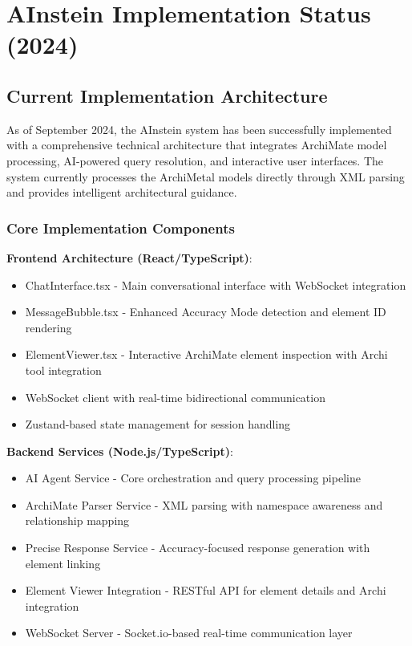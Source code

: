 \documentclass[12pt,a4paper]{article}
\begin{document}
\section{AInstein Implementation Status (2024)}

\subsection{Current Implementation Architecture}

As of September 2024, the AInstein system has been successfully implemented with a comprehensive technical architecture that integrates ArchiMate model processing, AI-powered query resolution, and interactive user interfaces. The system currently processes the ArchiMetal models directly through XML parsing and provides intelligent architectural guidance.

\subsubsection{Core Implementation Components}

\textbf{Frontend Architecture (React/TypeScript)}:
\begin{itemize}
    \item ChatInterface.tsx - Main conversational interface with WebSocket integration
    \item MessageBubble.tsx - Enhanced Accuracy Mode detection and element ID rendering
    \item ElementViewer.tsx - Interactive ArchiMate element inspection with Archi tool integration
    \item WebSocket client with real-time bidirectional communication
    \item Zustand-based state management for session handling
\end{itemize}

\textbf{Backend Services (Node.js/TypeScript)}:
\begin{itemize}
    \item AI Agent Service - Core orchestration and query processing pipeline
    \item ArchiMate Parser Service - XML parsing with namespace awareness and relationship mapping
    \item Precise Response Service - Accuracy-focused response generation with element linking
    \item Element Viewer Integration - RESTful API for element details and Archi integration
    \item WebSocket Server - Socket.io-based real-time communication layer
\end{itemize}
\end{document}
